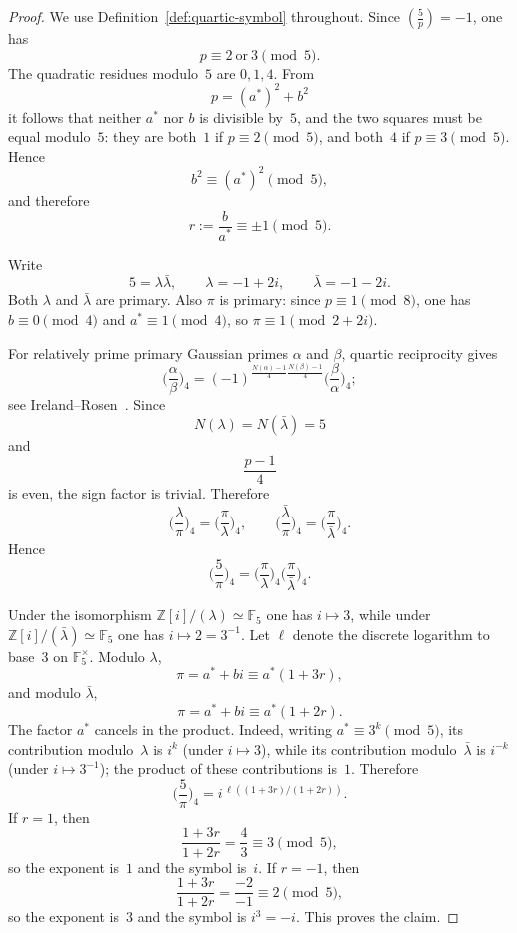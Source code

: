 \documentclass[11pt]{amsart}
\theoremstyle{plain}
\theoremstyle{definition}
\newcommand{\leg}[2]{\left(\frac{#1}{#2}\right)}
\begin{document}
\begin{proof}
We use Definition~\ref{def:quartic-symbol} throughout. Since
$\leg5p=-1$, one has
\[
  p\equiv2\ \text{or}\ 3\pmod5.
\]
The quadratic residues modulo~$5$ are $0,1,4$. From
\[
  p=(a^{*})^2+b^2
\]
it follows that neither $a^{*}$ nor $b$ is divisible by~$5$, and the two
squares must be equal modulo~$5$: they are both~$1$ if $p\equiv2\pmod5$,
and both~$4$ if $p\equiv3\pmod5$. Hence
\[
  b^2\equiv(a^{*})^2\pmod5,
\]
and therefore
\[
  r:=\frac{b}{a^{*}}\equiv\pm1\pmod5.
\]

Write
\[
  5=\lambda\bar\lambda,\qquad
  \lambda=-1+2i,\qquad
  \bar\lambda=-1-2i.
\]
Both $\lambda$ and $\bar\lambda$ are primary. Also $\pi$ is primary:
since $p\equiv1\pmod8$, one has $b\equiv0\pmod4$ and
$a^{*}\equiv1\pmod4$, so $\pi\equiv1\pmod{2+2i}$.

For relatively prime primary Gaussian primes $\alpha$ and $\beta$,
quartic reciprocity gives
\[
  \biggl(\frac{\alpha}{\beta}\biggr)_{\!4}
  =
  (-1)^{\frac{N(\alpha)-1}{4}\frac{N(\beta)-1}{4}}
  \biggl(\frac{\beta}{\alpha}\biggr)_{\!4};
\]
see Ireland--Rosen~\cite[Chapter~9, §9, pp.~123--126]{IR}.
Since
\[
  N(\lambda)=N(\bar\lambda)=5
\]
and
\[
  \frac{p-1}{4}
\]
is even, the sign factor is trivial. Therefore
\[
  \biggl(\frac{\lambda}{\pi}\biggr)_{\!4}
  =
  \biggl(\frac{\pi}{\lambda}\biggr)_{\!4},
  \qquad
  \biggl(\frac{\bar\lambda}{\pi}\biggr)_{\!4}
  =
  \biggl(\frac{\pi}{\bar\lambda}\biggr)_{\!4}.
\]
Hence
\[
  \biggl(\frac{5}{\pi}\biggr)_{\!4}
  =
  \biggl(\frac{\pi}{\lambda}\biggr)_{\!4}
  \biggl(\frac{\pi}{\bar\lambda}\biggr)_{\!4}.
\]

Under the isomorphism $\mathbb Z[i]/(\lambda)\simeq\mathbb F_5$ one has
$i\mapsto3$, while under
$\mathbb Z[i]/(\bar\lambda)\simeq\mathbb F_5$ one has $i\mapsto2=3^{-1}$.
Let $\ell$ denote the discrete logarithm to base~$3$ on $\mathbb F_5^\times$.
Modulo $\lambda$,
\[
  \pi=a^{*}+bi\equiv a^{*}(1+3r),
\]
and modulo $\bar\lambda$,
\[
  \pi=a^{*}+bi\equiv a^{*}(1+2r).
\]
The factor $a^{*}$ cancels in the product.  Indeed, writing
$a^{*}\equiv 3^{k}\pmod5$, its contribution modulo~$\lambda$ is
$i^{k}$ (under $i\mapsto3$), while its contribution
modulo~$\bar\lambda$ is $i^{-k}$ (under $i\mapsto3^{-1}$); the product
of these contributions is~$1$.  Therefore
\[
  \biggl(\frac{5}{\pi}\biggr)_{\!4}
  =
  i^{\,\ell((1+3r)/(1+2r))}.
\]
If $r=1$, then
\[
  \frac{1+3r}{1+2r}=\frac4{3}\equiv3\pmod5,
\]
so the exponent is~$1$ and the symbol is~$i$. If $r=-1$, then
\[
  \frac{1+3r}{1+2r}=\frac{-2}{-1}\equiv2\pmod5,
\]
so the exponent is~$3$ and the symbol is $i^3=-i$. This proves the claim.
\end{proof}
\end{document}
